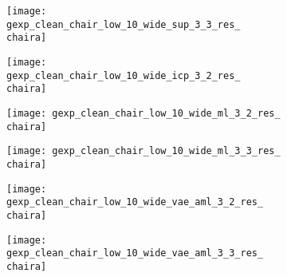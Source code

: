 \begin{figure*}[t]
{\begin{subfigure}[t]{1\textwidth}
\begin{subfigure}[t]{0.095\textwidth}
   			\texttt{[image: gexp\_clean\_chair\_low\_10\_wide\_sup\_3\_3\_res\_\\chaira]}
   		\end{subfigure}
   		\begin{subfigure}[t]{0.095\textwidth}
   			\vspace{0px}\centering
   			\texttt{[image: gexp\_clean\_chair\_low\_10\_wide\_icp\_3\_2\_res\_\\chaira]}
   		\end{subfigure}
        \begin{subfigure}[t]{0.095\textwidth}
            \vspace{0px}\centering
            \texttt{[image: gexp\_clean\_chair\_low\_10\_wide\_ml\_3\_2\_res\_\\chaira]}
        \end{subfigure}
   		\begin{subfigure}[t]{0.095\textwidth}
   			\vspace{0px}\centering
   			\texttt{[image: gexp\_clean\_chair\_low\_10\_wide\_ml\_3\_3\_res\_\\chaira]}
   		\end{subfigure}
   		\begin{subfigure}[t]{0.095\textwidth}
   			\vspace{0px}\centering
   			\texttt{[image: gexp\_clean\_chair\_low\_10\_wide\_vae\_aml\_3\_2\_res\_\\chaira]}
   		\end{subfigure}
   		\begin{subfigure}[t]{0.095\textwidth}
   			\vspace{0px}\centering
   			\texttt{[image: gexp\_clean\_chair\_low\_10\_wide\_vae\_aml\_3\_3\_res\_\\chaira]}
   		\end{subfigure}
   		\begin{subfigure}[t]{0.095\textwidth}
   			\vspace{0px}\centering

\end{subfigure}
\end{subfigure}}
\end{figure*}
